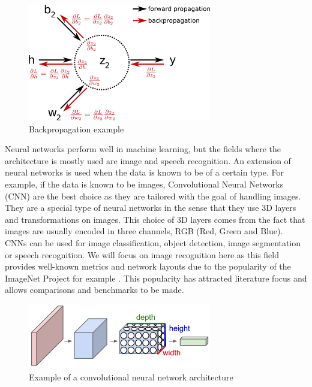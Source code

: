 \begin{figure}[htbp]
	\centering
		\includegraphics[width=8cm]{Figures/backpropagation.png}
	\caption[Backpropagation]{Backpropagation example}
	\label{fig:Backpropagation}
\end{figure}

Neural networks perform well in machine learning, but the fields where the architecture is mostly used are image and speech recognition. An extension of neural networks is used when the data is known to be of a certain type. For example, if the data is known to be images, Convolutional Neural Networks (CNN) are the best choice as they are tailored with the goal of handling images. They are a special type of neural networks in the sense that they use 3D layers and transformations on images. This choice of 3D layers comes from the fact that images are usually encoded in three channels, RGB (Red, Green and Blue). CNNs can be used for image classification, object detection, image segmentation or speech recognition. We will focus on image recognition here as this field provides well-known metrics and network layouts due to the popularity of the ImageNet Project for example \cite{ImageNet2009}. This popularity has attracted literature focus and allows comparisons and benchmarks to be made.

\begin{figure}[htbp]
	\centering
		\includegraphics[width=8cm]{Figures/CNN.png}
	\caption[Convolutional Neural Network Example]{Example of a convolutional neural network architecture \cite{Karpathy2015}}
	\label{fig:CNN}
\end{figure}

